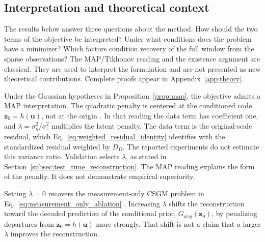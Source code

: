 \subsection{Interpretation and theoretical context}
\label{subsec:interpretation_scope}

The results below answer three questions about the method. How should the
two terms of the objective be interpreted? Under what conditions does the
problem have a minimizer? Which factors condition recovery of the full
window from the sparse observations? The MAP/Tikhonov reading and the
existence argument are classical. They are used to interpret the
formulation and are not presented as new theoretical contributions.
Complete proofs appear in Appendix~\ref{app:theory}.

Under the Gaussian hypotheses in Proposition~\ref{prop:map}, the objective
admits a MAP interpretation. The quadratic penalty is centered at the
conditioned code $\boldsymbol{z}_0=h(\boldsymbol{u})$, not at the origin
\citep{tikhonov1963solution,burger2014map}. In that reading the data term
has coefficient one, and
$\lambda=\sigma_{\eta}^{2}/\sigma_{z}^{2}$ multiplies the latent penalty.
The data term is the original-scale residual, which
Eq.~\eqref{eq:weighted_residual_identity} identifies with the standardized
residual weighted by $D_{\Omega}$. The reported experiments do not estimate
this variance ratio. Validation selects $\lambda$, as stated in
Section~\ref{subsec:test_time_reconstruction}. The MAP reading explains the
form of the penalty. It does not demonstrate empirical superiority.

\begin{remark}
\label{rem:csgm_relation}
Setting $\lambda=0$ recovers the measurement-only CSGM problem in
Eq.~\eqref{eq:measurement_only_ablation}
\citep{bora2017compressed}. Increasing $\lambda$ shifts the reconstruction
toward the decoded prediction of the conditional prior,
$G_{\mathrm{orig}}(\boldsymbol{z}_0)$, by penalizing departures
from $\boldsymbol{z}_0=h(\boldsymbol{u})$ more strongly. That shift is not
a claim that a larger $\lambda$ improves the reconstruction.
\end{remark}

